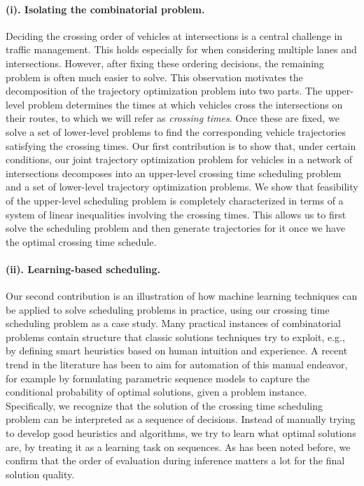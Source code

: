 \documentclass[a4paper]{report}
\theoremstyle{definition}
\theoremstyle{plain}
\begin{document}
\paragraph{(i). Isolating the combinatorial problem.}
Deciding the crossing order of vehicles at intersections is a central challenge
in traffic management. This holds especially for when considering multiple lanes
and intersections.
%
However, after fixing these ordering decisions, the remaining problem is often
much easier to solve. This observation motivates the decomposition of the
trajectory optimization problem into two parts.
%
The upper-level problem determines the times at which vehicles cross the
intersections on their routes, to which we will refer as \emph{crossing times}.
%
Once these are fixed, we solve a set of lower-level problems to find the
corresponding vehicle trajectories satisfying the crossing times.
%
Our first contribution is to show that, under certain conditions, our joint
trajectory optimization problem for vehicles in a network of intersections
decomposes into an upper-level crossing time scheduling problem and a set of
lower-level trajectory optimization problems. We show that feasibility of the
upper-level scheduling problem is completely characterized in terms of a system
of linear inequalities involving the crossing times. This allows us to first
solve the scheduling problem and then generate trajectories for it once we have
the optimal crossing time schedule.

\paragraph{(ii). Learning-based scheduling.}
Our second contribution is an illustration of how machine learning techniques
can be applied to solve scheduling problems in practice, using our crossing time
scheduling problem as a case study.
%
Many practical instances of combinatorial problems contain structure that
classic solutions techniques try to exploit, e.g., by defining smart heuristics
based on human intuition and experience.
%
A recent trend in the literature has been to aim for automation of this manual
endeavor, for example by formulating parametric sequence models to capture the
conditional probability of optimal solutions, given a problem instance.
%
Specifically, we recognize that the solution of the crossing time scheduling
problem can be interpreted as a sequence of decisions.
%
Instead of manually trying to develop good heuristics and algorithms, we try to
learn what optimal solutions are, by treating it as a learning task on
sequences.
%
As has been noted before, we confirm that the order of evaluation during
inference matters a lot for the final solution quality.
\end{document}
